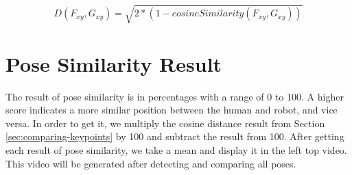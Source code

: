 \begin{equation}
  \label{eq:euclideandistance}
  D(F_{xy}, G_{xy}) = \sqrt{2 * (1 - cosineSimilarity(F_{xy}, G_{xy}))}
\end{equation}


\section{Pose Similarity Result}
\label{sec:pose-similarity-result}

The result of pose similarity is in percentages with a range of 0 to 100. A higher score indicates a more similar position between the human and robot, and vice versa.
In order to get it, we multiply the cosine distance result from Section \ref{sec:comparing-keypoints} by 100 and subtract the result from 100.
After getting each result of pose similarity, we take a mean and display it in the left top video. This video will be generated after detecting and comparing all poses.